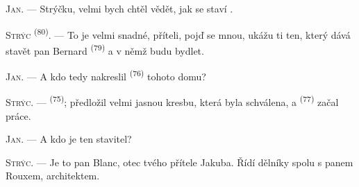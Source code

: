 %
%
%

\VUsaut{6.0mm}
\VUsaut{1.4mm}
\VUsaut{2.2mm}

\VUsaut{3.0mm}

\textsc{Jan}. --- Strýčku, velmi bych chtěl vědět, jak se staví .

\textsc{Strýc} \textsuperscript{(80)}. --- To je velmi snadné, příteli, pojď se mnou, ukážu ti
ten, který dává stavět pan Bernard \textsuperscript{(79)} a v němž budu bydlet.

\textsc{Jan}. --- A kdo tedy nakreslil  \textsuperscript{(76)} tohoto domu?

\textsc{Strýc}. ---  \textsuperscript{(75)}; předložil velmi jasnou kresbu,
která byla schválena, a  \textsuperscript{(77)} začal práce.

\textsc{Jan}. --- A kdo je ten stavitel?

\textsc{Strýc}. --- Je to pan Blanc, otec tvého přítele Jakuba. Řídí dělníky spolu s panem
Rouxem, architektem.

